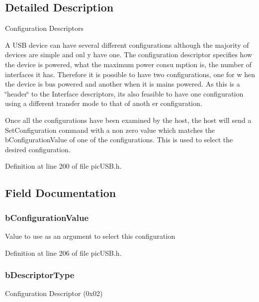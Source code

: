 \subsection{Detailed Description}
Configuration Descriptors\par
 A U\-S\-B device can have several different configurations although the majority of devices are simple and onl y have one. The configuration descriptor specifies how the device is powered, what the maximum power consu mption is, the number of interfaces it has. Therefore it is possible to have two configurations, one for w hen the device is bus powered and another when it is mains powered. As this is a \char`\"{}header\char`\"{} to the Interface descriptors, its also feasible to have one configuration using a different transfer mode to that of anoth er configuration.\par
 Once all the configurations have been examined by the host, the host will send a Set\-Configuration command with a non zero value which matches the b\-Configuration\-Value of one of the configurations. This is used to select the desired configuration. 

Definition at line 200 of file pic\-U\-S\-B.\-h.



\subsection{Field Documentation}
\hypertarget{struct_u_s_b___configuration___descriptor___header_a5cb9f9fbdc2e09c5d8b602ad41996186}{
\subsubsection[{b\-Configuration\-Value}]{ b\-Configuration\-Value}}\label{struct_u_s_b___configuration___descriptor___header_a5cb9f9fbdc2e09c5d8b602ad41996186}
Value to use as an argument to select this configuration 

Definition at line 206 of file pic\-U\-S\-B.\-h.

\hypertarget{struct_u_s_b___configuration___descriptor___header_af6d6c7e334878414c973fc10e54cfb4e}{
\subsubsection[{b\-Descriptor\-Type}]{ b\-Descriptor\-Type}}\label{struct_u_s_b___configuration___descriptor___header_af6d6c7e334878414c973fc10e54cfb4e}
Configuration Descriptor (0x02) 

